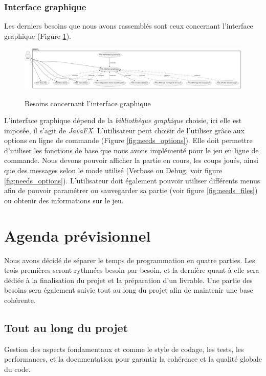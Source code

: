 \documentclass{article}
\begin{document}
\subsubsection{Interface graphique}
Les derniers besoins que nous avons rassemblés sont ceux concernant l'interface graphique (Figure \ref{fig:needs_gui}).
\begin{figure}[h]
    \caption{Besoins concernant l'interface graphique}
    \centering
    \includegraphics[width=\textwidth,height=\textheight,keepaspectratio]{needs_gui}
    \label{fig:needs_gui}
\end{figure}

L'interface graphique dépend de la \textit{bibliothèque graphique} choisie, ici elle est imposée, il s'agit de \textit{JavaFX}.
L'utilisateur peut choisir de l'utiliser grâce aux options en ligne de commande (Figure \ref{fig:needs_options}).
Elle doit permettre d'utiliser les fonctions de base que nous avons implémenté pour le jeu en ligne de commande. Nous devons 
pouvoir afficher la partie en cours, les coups joués, ainsi que des messages selon le mode utilisé (Verbose ou Debug, voir figure \ref{fig:needs_options}).
L'utilisateur doit également pouvoir utiliser différents menus afin de pouvoir paramétrer ou sauvegarder sa partie (voir figure \ref{fig:needs_files}) ou obtenir des informations sur le jeu.

\section{Agenda prévisionnel}
\label{agenda}

Nous avons décidé de séparer le temps de programmation en quatre parties. Les trois premières seront rythmées besoin par besoin, et la dernière quant à elle sera dédiée à la finalisation du projet et la préparation d'un livrable.
Une partie des besoins sera également suivie tout au long du projet afin de maintenir une base cohérente.

\subsection{Tout au long du projet}

Gestion des aspects fondamentaux et comme le style de codage, les tests, les performances, et la documentation pour garantir la cohérence et la qualité globale du code.
\end{document}
